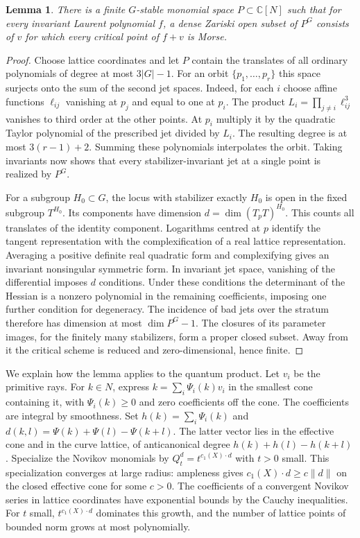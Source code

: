 \documentclass[11pt]{amsart}
\newtheorem{lemma}[theorem]{Lemma}
\theoremstyle{definition}
\newcommand{\C}{\mathbb C}
\begin{document}
\begin{lemma}\label{lem:morse}
There is a finite $G$-stable monomial space $P\subset\C[N]$ such that for every invariant Laurent polynomial $f$, a dense Zariski open subset of $P^G$ consists of $v$ for which every critical point of $f+v$ is Morse.
\end{lemma}
\begin{proof}
Choose lattice coordinates and let $P$ contain the translates of all ordinary polynomials of degree at most $3|G|-1$. For an orbit $\{p_1,\dots,p_r\}$ this space surjects onto the sum of the second jet spaces. Indeed, for each $i$ choose affine functions $\ell_{ij}$ vanishing at $p_j$ and equal to one at $p_i$. The product $L_i=\prod_{j\ne i}\ell_{ij}^3$ vanishes to third order at the other points. At $p_i$ multiply it by the quadratic Taylor polynomial of the prescribed jet divided by $L_i$. The resulting degree is at most $3(r-1)+2$. Summing these polynomials interpolates the orbit. Taking invariants now shows that every stabilizer-invariant jet at a single point is realized by $P^G$.

For a subgroup $H_0\subset G$, the locus with stabilizer exactly $H_0$ is open in the fixed subgroup $T^{H_0}$. Its components have dimension $d=\dim(T_pT)^{H_0}$. This counts all translates of the identity component. Logarithms centred at $p$ identify the tangent representation with the complexification of a real lattice representation. Averaging a positive definite real quadratic form and complexifying gives an invariant nonsingular symmetric form. In invariant jet space, vanishing of the differential imposes $d$ conditions. Under these conditions the determinant of the Hessian is a nonzero polynomial in the remaining coefficients, imposing one further condition for degeneracy. The incidence of bad jets over the stratum therefore has dimension at most $\dim P^G-1$. The closures of its parameter images, for the finitely many stabilizers, form a proper closed subset. Away from it the critical scheme is reduced and zero-dimensional, hence finite.
\end{proof}

We explain how the lemma applies to the quantum product. Let $v_i$ be the primitive rays. For $k\in N$, express $k=\sum_i\Psi_i(k)v_i$ in the smallest cone containing it, with $\Psi_i(k)\ge0$ and zero coefficients off the cone. The coefficients are integral by smoothness. Set $h(k)=\sum_i\Psi_i(k)$ and $d(k,l)=\Psi(k)+\Psi(l)-\Psi(k+l)$. The latter vector lies in the effective cone and in the curve lattice, of anticanonical degree $h(k)+h(l)-h(k+l)$ \cite[(2.5), Lemma~2.7]{CCIT}. Specialize the Novikov monomials by $Q_t^d=t^{c_1(X)\cdot d}$ with $t>0$ small. This specialization converges at large radius: ampleness gives $c_1(X)\cdot d\ge c\|d\|$ on the closed effective cone for some $c>0$. The coefficients of a convergent Novikov series in lattice coordinates have exponential bounds by the Cauchy inequalities. For $t$ small, $t^{c_1(X)\cdot d}$ dominates this growth, and the number of lattice points of bounded norm grows at most polynomially.
\end{document}
